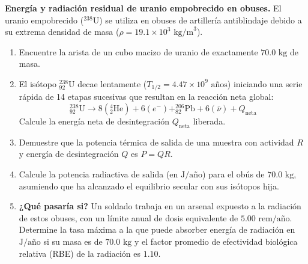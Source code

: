 \item \textbf{Energía y radiación residual de uranio empobrecido en obuses.}
El uranio empobrecido ($^{238}\text{U}$) se utiliza en obuses de artillería antiblindaje debido a su extrema densidad de masa ($\rho = 19.1 \times 10^3\text{ kg/m}^3$).
\begin{enumerate}
    \item Encuentre la arista de un cubo macizo de uranio de exactamente $70.0\text{ kg}$ de masa.
    \item El isótopo $^{238}_{92}\text{U}$ decae lentamente ($T_{1/2} = 4.47 \times 10^9\text{ años}$) iniciando una serie rápida de 14 etapas sucesivas que resultan en la reacción neta global:
    $$ ^{238}_{92}\text{U} \to 8(^{4}_{2}\text{He}) + 6(e^-) + ^{206}_{82}\text{Pb} + 6(\bar{\nu}) + Q_{\text{neta}} $$
    Calcule la energía neta de desintegración $Q_{\text{neta}}$ liberada.
    \item Demuestre que la potencia térmica de salida de una muestra con actividad $R$ y energía de desintegración $Q$ es $P = QR$.
    \item Calcule la potencia radiactiva de salida (en $\text{J/año}$) para el obús de $70.0\text{ kg}$, asumiendo que ha alcanzado el equilibrio secular con sus isótopos hija.
    \item \textbf{¿Qué pasaría si?} Un soldado trabaja en un arsenal expuesto a la radiación de estos obuses, con un límite anual de dosis equivalente de $5.00\text{ rem/año}$. Determine la tasa máxima a la que puede absorber energía de radiación en $\text{J/año}$ si su masa es de $70.0\text{ kg}$ y el factor promedio de efectividad biológica relativa (RBE) de la radiación es $1.10$.
\end{enumerate}